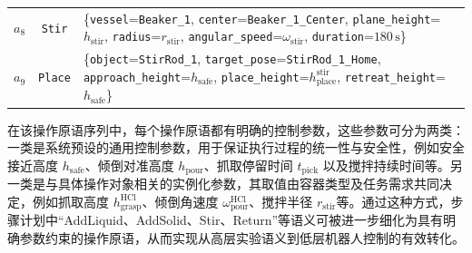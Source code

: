 \begin{table}[htbp]
\begin{tabular}{c c p{10.4cm}}
$a_8$ & \texttt{Stir} &
\{\texttt{vessel}=\texttt{Beaker\_1}, \texttt{center}=\texttt{Beaker\_1\_Center}, \texttt{plane\_height}=$h_{\mathrm{stir}}$, \texttt{radius}=$r_{\mathrm{stir}}$, \texttt{angular\_speed}=$\omega_{\mathrm{stir}}$, \texttt{duration}=$180\,\mathrm{s}$\} \\

$a_9$ & \texttt{Place} &
\{\texttt{object}=\texttt{StirRod\_1}, \texttt{target\_pose}=\texttt{StirRod\_1\_Home}, \texttt{approach\_height}=$h_{\mathrm{safe}}$, \texttt{place\_height}=$h_{\mathrm{place}}^{\mathrm{stir}}$, \texttt{retreat\_height}=$h_{\mathrm{safe}}$\} \\
\bottomrule
\end{tabular}
\end{table}

在该操作原语序列中，每个操作原语都有明确的控制参数，这些参数可分为两类：一类是系统预设的通用控制参数，用于保证执行过程的统一性与安全性，例如安全接近高度 $h_{\mathrm{safe}}$、倾倒对准高度 $h_{\mathrm{pour}}$、抓取停留时间 $t_{\mathrm{pick}}$ 以及搅拌持续时间等。另一类是与具体操作对象相关的实例化参数，其取值由容器类型及任务需求共同决定，例如抓取高度 $h_{\mathrm{grasp}}^{\mathrm{HCl}}$、倾倒角速度 $\omega_{\mathrm{pour}}^{\mathrm{HCl}}$、搅拌半径 $r_{\mathrm{stir}}$等。通过这种方式，步骤计划中“AddLiquid、AddSolid、Stir、Return”等语义可被进一步细化为具有明确参数约束的操作原语，从而实现从高层实验语义到低层机器人控制的有效转化。


